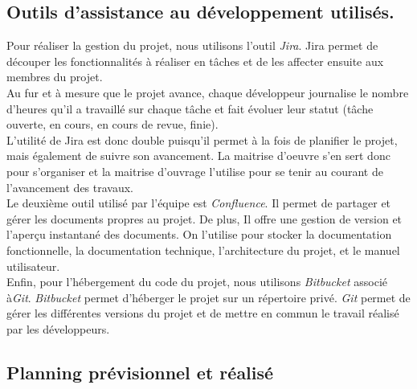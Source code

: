 
\subsection{Outils d'assistance au développement utilisés.}
Pour réaliser la gestion du projet, nous utilisons l'outil \textit{Jira}.
Jira permet de découper les fonctionnalités à réaliser en tâches et de les affecter ensuite aux membres du projet.\\
Au fur et à mesure que le projet avance, chaque développeur journalise le nombre d'heures qu'il a travaillé sur chaque tâche et fait évoluer leur statut (tâche ouverte, en cours, en cours de revue, finie).\\
L'utilité de Jira est donc double puisqu'il permet à la fois de planifier le projet, mais également de suivre son avancement. La maitrise d'oeuvre s'en sert donc pour s'organiser et la maitrise d'ouvrage l'utilise pour se tenir au courant de l'avancement des travaux.\\

Le deuxième outil utilisé par l'équipe est \textit{Confluence}. Il permet de partager et gérer les documents propres au projet. De plus, Il offre une gestion de version et l'aperçu instantané des documents. On l'utilise pour stocker la documentation fonctionnelle, la documentation technique, l'architecture du projet, et le manuel utilisateur.\\

Enfin, pour l'hébergement du code du projet, nous utilisons \textit{Bitbucket} associé à\textit{Git}. \textit{Bitbucket} permet d'héberger le projet sur un répertoire privé. \textit{Git} permet de gérer les différentes versions du projet et de mettre en commun le travail réalisé par les développeurs. 


\newpage
\subsection{Planning prévisionnel et réalisé} %
